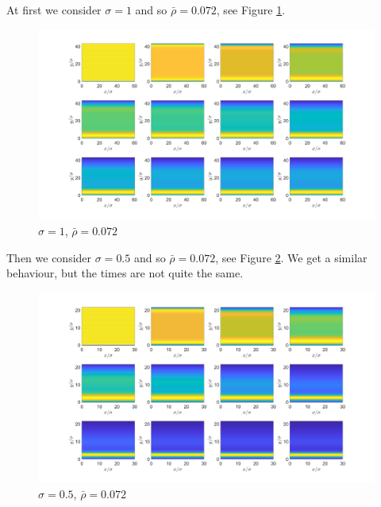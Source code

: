 \documentclass[11pt, a4paper]{article}
\theoremstyle{definition}
\begin{document}
	At first we consider $\sigma = 1$ and so $\bar \rho = 0.072$, see Figure \ref{F4}. 
	\begin{figure}[h]
		\centering
		\includegraphics[scale=0.25]{Periodic1.png}
		\caption{$\sigma =1$, $\bar \rho =0.072$} 
		\label{F4}
	\end{figure}
	Then we consider $\sigma = 0.5$ and so $\bar \rho = 0.072$, see Figure \ref{F5}. We get a similar behaviour, but the times are not quite the same.
	\begin{figure}[h]
		\centering
		\includegraphics[scale=0.25]{Periodic2.png}
		\caption{$\sigma =0.5$, $\bar \rho =0.072$} 
		\label{F5}
	\end{figure}
	
\end{document}
